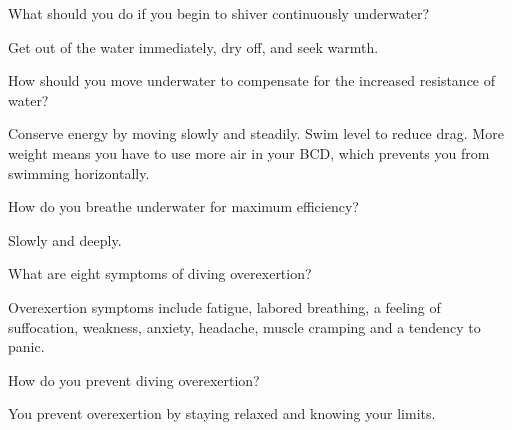 	\begin{qanda}
		\begin{question}
What should you do if you begin to shiver continuously underwater?
		\end{question}

		\begin{answer}
Get out of the water immediately, dry off, and seek warmth.
		\end{answer}
	\end{qanda}

	\begin{qanda}
		\begin{question}
How should you move underwater to compensate for the increased resistance of water?
		\end{question}

		\begin{answer}
Conserve energy by moving slowly and steadily.  Swim level to reduce drag.  More weight means you have to use more air in your BCD, which prevents you from swimming horizontally.
		\end{answer}
	\end{qanda}

	\begin{qanda}
		\begin{question}
How do you breathe underwater for maximum efficiency?
		\end{question}

		\begin{answer}
Slowly and deeply.
		\end{answer}
	\end{qanda}

	\begin{qanda}
		\begin{question}
What are eight symptoms of diving overexertion?
		\end{question}

		\begin{answer}
Overexertion symptoms include fatigue, labored breathing, a feeling of suffocation, weakness, anxiety, headache, muscle cramping and a tendency to panic.
		\end{answer}
	\end{qanda}

	\begin{qanda}
		\begin{question}
How do you prevent diving overexertion?
		\end{question}

		\begin{answer}
You prevent overexertion by staying relaxed and knowing your limits.
		\end{answer}
	\end{qanda}

